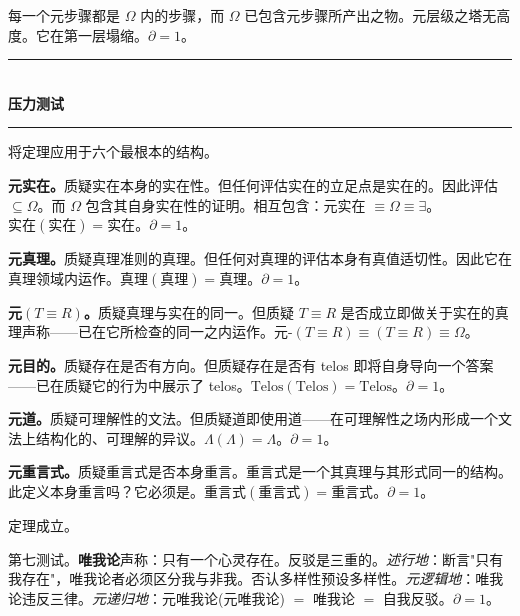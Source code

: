 \documentclass[10pt, openany, oneside]{book}
\renewcommand{\normalsize}{\fontsize{10}{13}\selectfont}
\begin{document}
\noindent 每一个元步骤都是 $\Omega$ 内的步骤，而 $\Omega$ 已包含元步骤所产出之物。元层级之塔无高度。它在第一层塌缩。$\partial = 1$。

\vspace{1.5em}


\begin{center}
    \rule{0.3\textwidth}{0.4pt}\\[0.5em]
    {\normalsize\bfseries\scshape 压力测试}\\[0.3em]
    \rule{0.3\textwidth}{0.4pt}
\end{center}

\vspace{1em}

\noindent 将定理应用于六个最根本的结构。

\textbf{元实在。}质疑实在本身的实在性。但任何评估实在的立足点是实在的。因此评估 $\subseteq \Omega$。而 $\Omega$ 包含其自身实在性的证明。相互包含：元实在 $\equiv \Omega \equiv \exists$。$\text{实在}(\text{实在}) = \text{实在}$。$\partial = 1$。

\textbf{元真理。}质疑真理准则的真理。但任何对真理的评估本身有真值适切性。因此它在真理领域内运作。$\text{真理}(\text{真理}) = \text{真理}$。$\partial = 1$。

\textbf{元$(T \equiv R)$。}质疑真理与实在的同一。但质疑 $T \equiv R$ 是否成立即做关于实在的真理声称——已在它所检查的同一之内运作。元-$(T \equiv R) \equiv (T \equiv R) \equiv \Omega$。

\textbf{元目的。}质疑存在是否有方向。但质疑存在是否有 telos 即将自身导向一个答案——已在质疑它的行为中展示了 telos。$\text{Telos}(\text{Telos}) = \text{Telos}$。$\partial = 1$。

\textbf{元道。}质疑可理解性的文法。但质疑道即使用道——在可理解性之场内形成一个文法上结构化的、可理解的异议。$\Lambda(\Lambda) = \Lambda$。$\partial = 1$。

\textbf{元重言式。}质疑重言式是否本身重言。重言式是一个其真理与其形式同一的结构。此定义本身重言吗？它必须是。$\text{重言式}(\text{重言式}) = \text{重言式}$。$\partial = 1$。

定理成立。

\vspace{0.5em}

第七测试。\textbf{唯我论}声称：只有一个心灵存在。反驳是三重的。\textit{述行地}：断言"只有我存在"，唯我论者必须区分我与非我。否认多样性预设多样性。\textit{元逻辑地}：唯我论违反三律。\textit{元递归地}：元唯我论(元唯我论) $=$ 唯我论 $=$ 自我反驳。$\partial = 1$。
\end{document}

